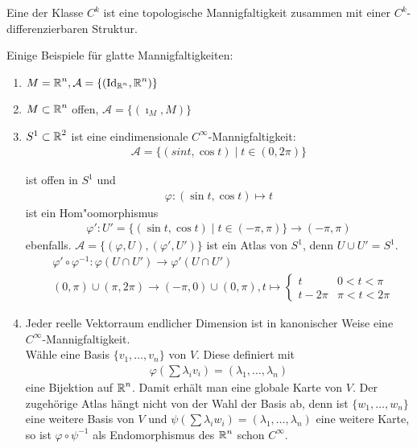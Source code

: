 \begin{dfn}
  Eine  der Klasse $C^k$ ist eine topologische Mannigfaltigkeit zusammen mit einer $C^{k}$-differenzierbaren Struktur.\\
\end{dfn}

\begin{bsp}
  Einige Beispiele für glatte Mannigfaltigkeiten:
  \begin{enumerate}
  \item $M = \operatorname{\mathbb{R}}^n, \mathcal A = \{(\operatorname{Id}_{\operatorname{\mathbb{R}}^n},\operatorname{\mathbb{R}}^n)\}$
  \item $M \subset \operatorname{\mathbb{R}}^n$ offen, $\mathcal A = \{(\imath_{M},M)\}$
  \item $S^1 \subset \operatorname{\mathbb{R}}^2$ ist eine eindimensionale $C^{\infty}$-Mannigfaltigkeit:
    \begin{align*}
      \mathcal A = \{(sin t, \cos t) \mid t \in (0,2\pi)\}
    \end{align*}


    ist offen in $S^1$ und
    \begin{align*}
      \varphi \colon (\sin t, \cos t) \mapsto t
    \end{align*}
    ist ein Hom"oomorphismus
    \begin{align*}
      \varphi' \colon U' = \{(\sin t, \cos t) \mid t \in (-\pi,\pi)\} \to (-\pi,\pi)
    \end{align*}
    ebenfalls. $\mathcal A = \{(\varphi, U), (\varphi',U')\}$ ist ein Atlas von $S^1$, denn $U \cup U' = S^1$.
    \begin{align*}
      & \varphi' \circ \varphi^{-1} \colon \varphi(U \cap U') \to \varphi'(U \cap U')\\
      & (0,\pi)\cup(\pi,2\pi) \to (-\pi,0)\cup(0,\pi), t \mapsto \begin{cases}
        t & 0 < t < \pi\\
        t-2\pi & \pi < t < 2\pi
      \end{cases}
    \end{align*}

  \item Jeder reelle Vektorraum endlicher Dimension ist in kanonischer Weise eine $C^{\infty}$-Mannigfaltigkeit.\\
    Wähle eine Basis $\{v_1, \ldots, v_n\}$ von $V$. Diese definiert mit
    \begin{align*}
      \varphi\left(\sum\lambda_iv_i\right) = (\lambda_1, \ldots, \lambda_n)
    \end{align*}
    eine Bijektion auf $\operatorname{\mathbb{R}}^n$. Damit erhält man eine globale Karte von $V$.
    Der zugehörige Atlas hängt nicht von der Wahl der Basis ab, denn ist $\{w_1, \ldots, w_n\}$ eine weitere Basis von $V$ und $\psi(\sum \lambda_iw_i) = (\lambda_1, \ldots, \lambda_n)$ eine weitere Karte, so ist $\varphi \circ \psi^{-1}$ als Endomorphismus des $\operatorname{\mathbb{R}}^n$ schon $C^{\infty}$.


\end{enumerate}
\end{bsp}
